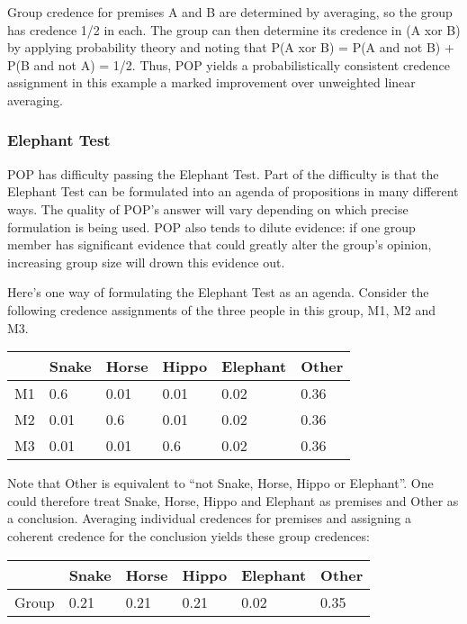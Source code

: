 \documentclass{article}
\begin{document}
Group credence for premises A and B are determined by averaging, so the group has credence 1/2 in each. The group can then determine its credence in (A xor B) by applying probability theory and noting that P(A xor B) = P(A and not B) + P(B and not A) = 1/2. Thus, POP yields a probabilistically consistent credence assignment in this example \textemdash{} a marked improvement over unweighted linear averaging. 

\subsubsection{Elephant Test}

POP has difficulty passing the Elephant Test. Part of the difficulty is that the Elephant Test can be formulated into an agenda of propositions in many different ways. The quality of POP's answer will vary depending on which precise formulation is being used. POP also tends to dilute evidence: if one group member has significant evidence that could greatly alter the group's opinion, increasing group size will drown this evidence out.

Here's one way of formulating the Elephant Test as an agenda. Consider the following credence assignments of the three people in this group, M1, M2 and M3. 

\begin{center}
\begin{tabular}{ | l | l | l | l | l | l |}
  \hline 
     & Snake & Horse & Hippo & Elephant & Other \\ \hline
  M1 & 0.6 & 0.01 & 0.01 & 0.02 & 0.36 \\ \hline
  M2 & 0.01 & 0.6 & 0.01 & 0.02 & 0.36 \\ \hline
  M3 & 0.01 & 0.01 & 0.6 & 0.02 & 0.36 \\ \hline
\end{tabular}
\end{center}

Note that Other is equivalent to ``not Snake, Horse, Hippo or Elephant''. One could therefore treat Snake, Horse, Hippo and Elephant as premises and Other as a conclusion. Averaging individual credences for premises and assigning a coherent credence for the conclusion yields these group credences:

\begin{center}
\begin{tabular}{ | l | l | l | l | l | l |}
  \hline 
     & Snake & Horse & Hippo & Elephant & Other \\ \hline
  Group & 0.21 & 0.21 & 0.21 & 0.02 & 0.35 \\ \hline
\end{tabular}
\end{center}
\end{document}
